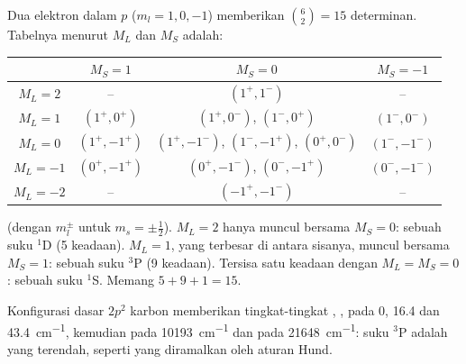\begin{example}\label{ex:b3:many-electron-atoms:p2}
Dua elektron dalam $p$ ($m_l = 1, 0, -1$) memberikan $\binom62 = 15$ determinan.
Tabelnya menurut $M_L$ dan $M_S$ adalah:
\begin{center}\small
\begin{tabular}{c|ccc}
\hline
 & $M_S = 1$ & $M_S = 0$ & $M_S = -1$\\ \hline
$M_L = 2$ & -- & $(1^+,1^-)$ & --\\
$M_L = 1$ & $(1^+,0^+)$ & $(1^+,0^-)$, $(1^-,0^+)$ & $(1^-,0^-)$\\
$M_L = 0$ & $(1^+,-1^+)$ & $(1^+,-1^-)$, $(1^-,-1^+)$, $(0^+,0^-)$ & $(1^-,-1^-)$\\
$M_L = -1$ & $(0^+,-1^+)$ & $(0^+,-1^-)$, $(0^-,-1^+)$ & $(0^-,-1^-)$\\
$M_L = -2$ & -- & $(-1^+,-1^-)$ & --\\ \hline
\end{tabular}
\end{center}
(dengan $m_l^\pm$ untuk $m_s = \pm\frac12$). $M_L = 2$ hanya muncul bersama
$M_S = 0$: sebuah suku ${}^1$D (5 keadaan). $M_L = 1$, yang terbesar di antara
sisanya, muncul bersama $M_S = 1$: sebuah suku ${}^3$P (9 keadaan). Tersisa
satu keadaan dengan $M_L = M_S = 0$: sebuah suku ${}^1$S. Memang
$5 + 9 + 1 = 15$.
\end{example}

\begin{example}\label{ex:b3:many-electron-atoms:carbon}
Konfigurasi dasar $2p^2$ karbon memberikan tingkat-tingkat ,
,  pada 0, 16.4 dan \qty{43.4}{cm^{-1}},
kemudian  pada \qty{10193}{cm^{-1}} dan 
pada \qty{21648}{cm^{-1}}: suku ${}^3$P adalah yang terendah, seperti yang
diramalkan oleh aturan Hund.
\end{example}

